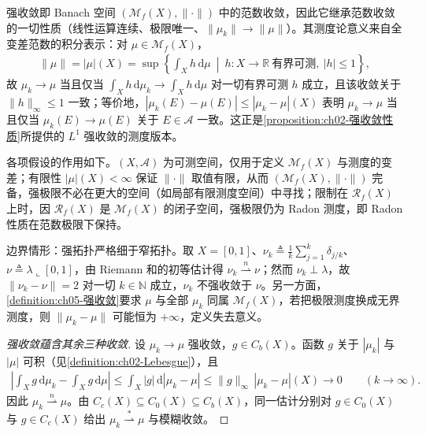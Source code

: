 \documentclass[../../main.tex]{subfiles}%
\begin{document}
\begin{remark}\label{remark:ch05-强收敛动机}
强收敛即 Banach 空间 $(\mathcal{M}_f(X),\|\cdot\|)$ 中的范数收敛，因此它继承范数收敛的一切性质（线性运算连续、极限唯一、$\|\mu_k\|\to\|\mu\|$）。其测度论意义来自全变差范数的积分表示：对 $\mu\in\mathcal{M}_f(X)$，
\begin{align*}
\|\mu\|=|\mu|(X)=\sup\left\{\int_X h\,\mathrm{d}\mu\ \middle|\ h:X\to\mathbb{R}\ \text{有界可测},\ |h|\leqslant1\right\},
\end{align*}
故 $\mu_k\to\mu$ 当且仅当 $\int_X h\,\mathrm{d}\mu_k\to\int_X h\,\mathrm{d}\mu$ 对一切有界可测 $h$ 成立，且该收敛关于 $\|h\|_\infty\leqslant1$ 一致；等价地，$|\mu_k(E)-\mu(E)|\leqslant|\mu_k-\mu|(X)$ 表明 $\mu_k\to\mu$ 当且仅当 $\mu_k(E)\to\mu(E)$ 关于 $E\in\mathscr{A}$ 一致。这正是\cref{proposition:ch02-强收敛性质}所提供的 $L^1$ 强收敛的测度版本。

各项假设的作用如下。$(X,\mathscr{A})$ 为可测空间，仅用于定义 $\mathcal{M}_f(X)$ 与测度的变差；有限性 $|\mu|(X)<\infty$ 保证 $\|\cdot\|$ 取值有限，从而 $(\mathcal{M}_f(X),\|\cdot\|)$ 完备，强极限不必在更大的空间（如局部有限测度空间）中寻找；限制在 $\mathscr{R}_f(X)$ 上时，因 $\mathscr{R}_f(X)$ 是 $\mathcal{M}_f(X)$ 的闭子空间，强极限仍为 Radon 测度，即 Radon 性质在范数极限下保持。

边界情形：强拓扑严格细于窄拓扑。取 $X=[0,1]$、$\nu_k\triangleq\frac1k\sum_{j=1}^k\delta_{j/k}$、$\nu\triangleq\lambda\llcorner[0,1]$，由 Riemann 和的初等估计得 $\nu_k\stackrel{n}{\rightharpoonup}\nu$；然而 $\nu_k\perp\lambda$，故 $\|\nu_k-\nu\|=2$ 对一切 $k\in\mathbb{N}$ 成立，$\nu_k$ 不强收敛于 $\nu$。另一方面，\cref{definition:ch05-强收敛}要求 $\mu$ 与全部 $\mu_k$ 同属 $\mathcal{M}_f(X)$，若把极限测度换成无界测度，则 $\|\mu_k-\mu\|$ 可能恒为 $+\infty$，定义失去意义。
\end{remark}

\begin{proof}[强收敛蕴含其余三种收敛]
设 $\mu_k\to\mu$ 强收敛，$g\in C_b(X)$。函数 $g$ 关于 $|\mu_k|$ 与 $|\mu|$ 可积（见\cref{definition:ch02-Lebesgue}），且
\begin{align*}
\left|\int_X g\,\mathrm{d}\mu_k-\int_X g\,\mathrm{d}\mu\right|
\leqslant\int_X|g|\,\mathrm{d}|\mu_k-\mu|
\leqslant\|g\|_\infty\,|\mu_k-\mu|(X)\longrightarrow0
\qquad(k\to\infty).
\end{align*}
因此 $\mu_k\stackrel{n}{\rightharpoonup}\mu$。由 $C_c(X)\subseteq C_0(X)\subseteq C_b(X)$，同一估计分别对 $g\in C_0(X)$ 与 $g\in C_c(X)$ 给出 $\mu_k\stackrel{*}{\rightharpoonup}\mu$ 与模糊收敛。
\end{proof}
\end{document}
